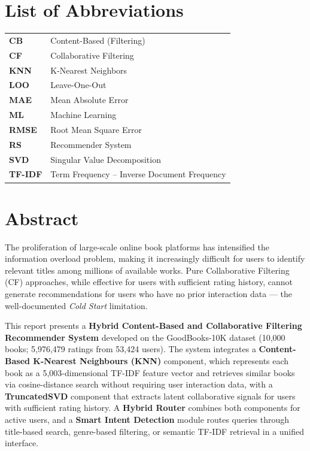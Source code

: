 \documentclass[12pt, a4paper]{article}
\begin{document}
\newpage
\thispagestyle{fancy}
\section*{List of Abbreviations}

\begin{tabular}{@{}ll@{}}
  \textbf{CB}     & Content-Based (Filtering) \\
  \textbf{CF}     & Collaborative Filtering \\
  \textbf{KNN}    & K-Nearest Neighbors \\
  \textbf{LOO}    & Leave-One-Out \\
  \textbf{MAE}    & Mean Absolute Error \\
  \textbf{ML}     & Machine Learning \\
  \textbf{RMSE}   & Root Mean Square Error \\
  \textbf{RS}     & Recommender System \\
  \textbf{SVD}    & Singular Value Decomposition \\
  \textbf{TF-IDF} & Term Frequency -- Inverse Document Frequency \\
\end{tabular}

\newpage
\thispagestyle{fancy}
\section*{Abstract}

The proliferation of large-scale online book platforms has intensified the information
overload problem, making it increasingly difficult for users to identify relevant titles
among millions of available works.
Pure Collaborative Filtering (CF) approaches, while effective for users with sufficient
rating history, cannot generate recommendations for users who have no prior interaction
data --- the well-documented \textit{Cold Start} limitation.

This report presents a \textbf{Hybrid Content-Based and Collaborative Filtering
Recommender System} developed on the GoodBooks-10K dataset
(10,000 books; 5,976,479 ratings from 53,424 users).
The system integrates a \textbf{Content-Based K-Nearest Neighbours (KNN)} component,
which represents each book as a 5,003-dimensional TF-IDF feature vector and
retrieves similar books via cosine-distance search without requiring user interaction data,
with a \textbf{TruncatedSVD} component that extracts latent collaborative signals
for users with sufficient rating history.
A \textbf{Hybrid Router} combines both components for active users,
and a \textbf{Smart Intent Detection} module routes queries through title-based search,
genre-based filtering, or semantic TF-IDF retrieval in a unified interface.
\end{document}
